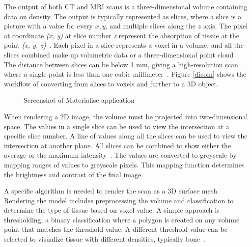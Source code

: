 \documentclass[a4paper]{report}
\begin{document}
The output of both CT and MRI scans is a three-dimensional volume containing data on density. The output is typically represented as slices, where a slice is a picture with a value for every $x,y$, and multiple slices along the $z$ axis. The pixel at coordinate \emph{(x, y)} at slice number \emph{z} represent the absorption of tissue at the point \emph{(x, y, z)}~\cite{chougule_conversions_2013}.
Each pixel in a slice represents a voxel in a volume, and all the slices combined make up volumetric data or a three-dimensional point cloud~\cite{chougule_conversions_2013}.
The distance between slices can be below 1 mm, giving a high-resolution scan where a single point is less than one cubic millimeter~\cite{hamblen_outline_2010}. Figure \ref{dicom} shows the workflow of converting from slices to voxels and further to a 3D object.

\begin{figure}[h!]
    \centering
	\hfill
	\caption{Screenshot of Materialise application \cite{materialise_medical_nodate}}
 \label{mat}
\end{figure}

When rendering a 2D image, the volume must be projected into two-dimensional space. The values in a single slice can be used to view the intersection at a specific slice number. A line of values along all the slices can be used to view the intersection at another plane.
All slices can be combined to show either the average or the maximum intensity~\cite{fishman_volume_2006}.
The values are converted to greyscale by mapping ranges of values to greyscale pixels. This mapping function determines the brightness and contrast of the final image.

A specific algorithm is needed to render the scan as a 3D surface mesh. Rendering the model includes preprocessing the volume and classification to determine the type of tissue based on voxel value. A simple approach is thresholding, a binary classification where a polygon is created on any volume point that matches the threshold value. A different threshold value can be selected to visualize tissue with different densities, typically bone~\cite{fishman_volume_2006}.
\end{document}
